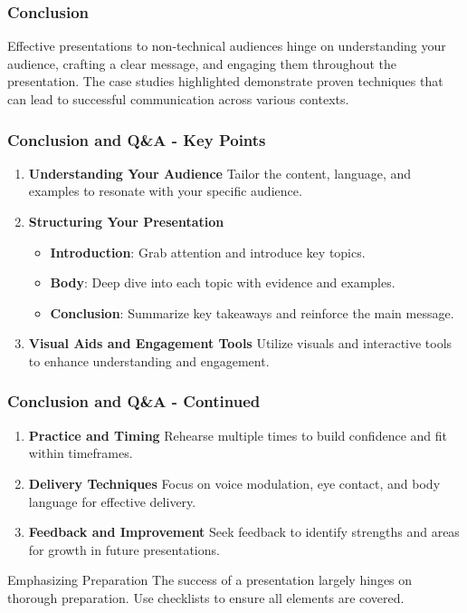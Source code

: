 \documentclass[aspectratio=169]{beamer}
\begin{document}
\begin{frame}[fragile]
    \frametitle{Conclusion}
    Effective presentations to non-technical audiences hinge on understanding your audience, crafting a clear message, and engaging them throughout the presentation. 
    The case studies highlighted demonstrate proven techniques that can lead to successful communication across various contexts.
\end{frame}

\begin{frame}[fragile]
    \frametitle{Conclusion and Q\&A - Key Points}
    \begin{enumerate}
        \item \textbf{Understanding Your Audience}  
              Tailor the content, language, and examples to resonate with your specific audience.
        \item \textbf{Structuring Your Presentation}
              \begin{itemize}
                  \item \textbf{Introduction}: Grab attention and introduce key topics.
                  \item \textbf{Body}: Deep dive into each topic with evidence and examples.
                  \item \textbf{Conclusion}: Summarize key takeaways and reinforce the main message.
              \end{itemize}
        \item \textbf{Visual Aids and Engagement Tools}  
              Utilize visuals and interactive tools to enhance understanding and engagement.
    \end{enumerate}
\end{frame}

\begin{frame}[fragile]
    \frametitle{Conclusion and Q\&A - Continued}
    \begin{enumerate}[resume] %
        \item \textbf{Practice and Timing}  
              Rehearse multiple times to build confidence and fit within timeframes.
        \item \textbf{Delivery Techniques}  
              Focus on voice modulation, eye contact, and body language for effective delivery.
        \item \textbf{Feedback and Improvement}  
              Seek feedback to identify strengths and areas for growth in future presentations.
    \end{enumerate}
    
    \begin{block}{Emphasizing Preparation}
        The success of a presentation largely hinges on thorough preparation. Use checklists to ensure all elements are covered.
    \end{block}
\end{frame}
\end{document}
